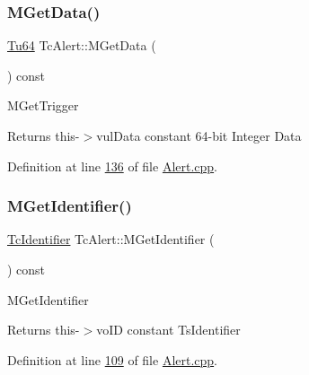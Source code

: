 \subsubsection{\texorpdfstring{M\+Get\+Data()}{MGetData()}}
{\footnotesize\ttfamily \mbox{\hyperlink{namespace_g_n_common_a9404ee6090c788ae70aebd1436ceb97d}{Tu64}} Tc\+Alert\+::\+M\+Get\+Data (\begin{DoxyParamCaption}\item[{void}]{ }\end{DoxyParamCaption}) const}

M\+Get\+Trigger \begin{DoxyReturn}{Returns}
this-\/$>$vul\+Data constant 64-\/bit Integer Data 
\end{DoxyReturn}


Definition at line \mbox{\hyperlink{_alert_8cpp_source_l00136}{136}} of file \mbox{\hyperlink{_alert_8cpp_source}{Alert.\+cpp}}.

\mbox{\label{class_g_n_common_1_1_n_notification_1_1_tc_alert_a3387c702b35bffddf5a480cdd52498aa}} 
\subsubsection{\texorpdfstring{M\+Get\+Identifier()}{MGetIdentifier()}}
{\footnotesize\ttfamily \mbox{\hyperlink{class_g_n_common_1_1_n_notification_1_1_tc_identifier}{Tc\+Identifier}} Tc\+Alert\+::\+M\+Get\+Identifier (\begin{DoxyParamCaption}\item[{void}]{ }\end{DoxyParamCaption}) const}

M\+Get\+Identifier \begin{DoxyReturn}{Returns}
this-\/$>$vo\+ID constant Ts\+Identifier 
\end{DoxyReturn}


Definition at line \mbox{\hyperlink{_alert_8cpp_source_l00109}{109}} of file \mbox{\hyperlink{_alert_8cpp_source}{Alert.\+cpp}}.

\mbox{\label{class_g_n_common_1_1_n_notification_1_1_tc_alert_af6c3e9f29e796c2140dbe52229d439ca}} 
